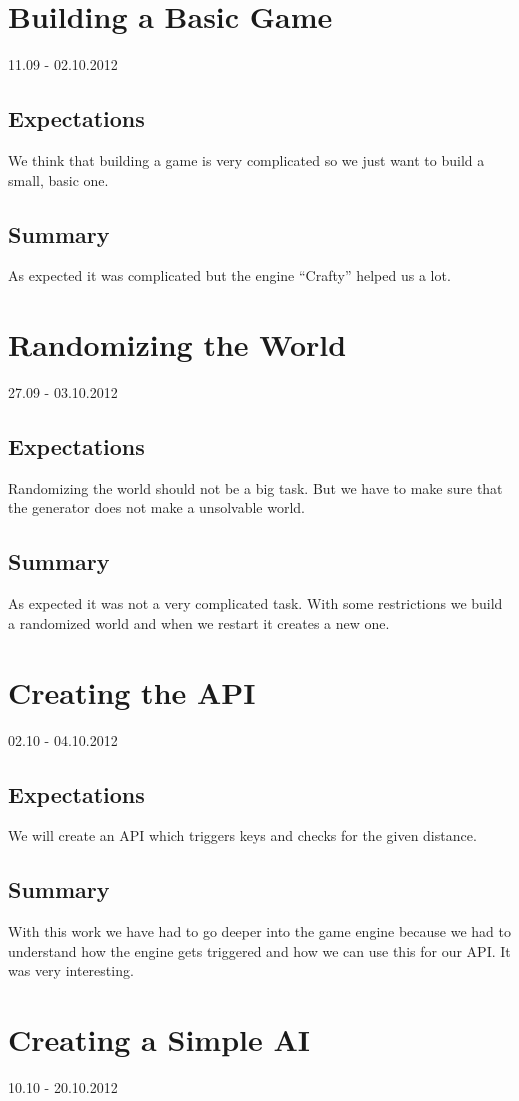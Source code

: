 \section{Building a Basic Game}
11.09 - 02.10.2012
\subsection*{Expectations}
We think that building a game is very complicated so we just want to build a small, basic one.
\subsection*{Summary}
As expected it was complicated but the engine ``Crafty'' helped us a lot.

\section{Randomizing the World}
27.09 - 03.10.2012
\subsection*{Expectations}
Randomizing the world should not be a big task. But we have to make sure that the generator does not make a unsolvable world.
\subsection*{Summary}
As expected it was not a very complicated task. With some restrictions we build a randomized world and when we restart it creates a new one.

\section{Creating the API}
02.10 - 04.10.2012
\subsection*{Expectations}
We will create an API which triggers keys and checks for the given distance.
\subsection*{Summary}
With this work we have had to go deeper into the game engine because we had to understand how the engine gets triggered and how we can use this for our API. It was very interesting.

\section{Creating a Simple AI}
10.10 - 20.10.2012
